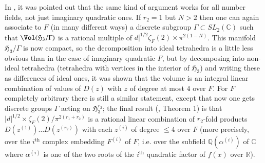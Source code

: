 In \cite{art15-key8}, it was pointed out that the same kind of argument works for all number fields, not just imaginary quadratic ones. If $r_{2}=1$ but $N>2$ then one can again associate to $F$ (in many different ways) a discrete subgroup $\Gamma\subset SL_{2}(\mathbb{C})$ such that $\Vol(\mathfrak{H}_{3}/\Gamma)$ is a rational multiple of $d|^{1/2}\zeta_{F}(2)\times \pi^{2(1-N)}$. This manifold $\mathfrak{H}_{3}/\Gamma$ is now compact, so the decomposition into ideal tetrahedra is a little less obvious than in the case of imaginary quadratic $F$, but by decomposing into non-ideal tetrahedra (tetrahedra with vertices in the interior of $\mathfrak{H}_{3}$) and writing these as differences of ideal ones, it was shown that the volume is an integral linear combination of values of $D(z)$ with $z$ of degree at most $4$ over $F$. For $F$ completely arbitrary there is still a similar statement, except that now one gets discrete groups $\Gamma$ acting on $\mathfrak{H}^{r_{2}}_{3}$; the final result (\cite{art15-key8}, Theorem 1) is that $|d|^{1/2}\times \zeta_{F}(2)/\pi^{2(r_{1}+r_{2})}$ is a rational linear combination of $r_{2}$-fold products $D(z^{(1)})\ldots D(z^{(r_{2})})$ with each $z^{(i)}$ of degree $\leq 4$ over $F$ (more precisely, over the $i^{\text{th}}$ complex embedding $F^{(i)}$ of $F$, i.e. over the subfield $\mathbb{Q}(\alpha^{(i)})$ of $\mathbb{C}$ where $\alpha^{(i)}$ is one of the two roots of the $i^{\text{th}}$ quadratic factor of $f(x)$ over $\mathbb{R}$).

